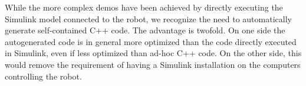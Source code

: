 While the more complex demos have been achieved by directly executing the Simulink model connected to the robot, we recognize the need to automatically generate self-contained C++ code.
The advantage is twofold.
On one side the autogenerated code is in general more optimized than the code directly executed in Simulink, even if less optimized than ad-hoc C++ code.
On the other side, this would remove the requirement of having a Simulink installation on the computers controlling the robot.
